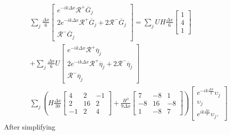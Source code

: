 \begin{multline*}
\sum_j \frac{\Delta x}{6} \begin{bmatrix} e^{-ik\Delta x} \mathcal{R}^+ \overline{G}_{j} \\2 e^{-ik\Delta x} \mathcal{R}^+\overline{G}_{j} +2 \mathcal{R}^- \overline{G}_{j}\\ \mathcal{R}^- \overline{G}_{j} \end{bmatrix} =   \sum_jUH \frac{\Delta x}{6}\begin{bmatrix} 1 \\4 \\ 1 \end{bmatrix} \\+  \sum_j \frac{\Delta x}{6} U \begin{bmatrix} e^{-ik\Delta x} \mathcal{R}^+ \overline{\eta}_{j} \\2 e^{-ik\Delta x} \mathcal{R}^+\overline{\eta}_{j} +2 \mathcal{R}^- \overline{\eta}_{j}\\ \mathcal{R}^- \overline{\eta}_{j} \end{bmatrix}  \\\sum_j \left(H\frac{\Delta x}{30}\begin{bmatrix} 4 &2 &-1 \\2 &16 &2  \\-1 &2 &4 \end{bmatrix} + \frac{H^3 }{9\Delta x}\begin{bmatrix} 7 &-8 &1  \\-8 &16 &-8  \\1 &-8 &7  \end{bmatrix} \right) \begin{bmatrix} e^{-ik\frac{\Delta x}{2}}\upsilon_{j} \\\upsilon_{j} \\ e^{ik\frac{\Delta x}{2}}\upsilon_{j}. \end{bmatrix}
\end{multline*}
After simplifying
